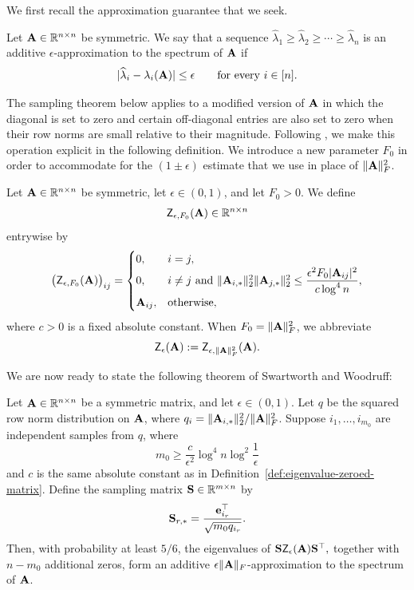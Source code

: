 We first recall the approximation guarantee that we seek.

\begin{definition}
\label{def:additive-eigenvalue-approximation}
Let \(\mathbf{A}\in\mathbb{R}^{n\times n}\) be symmetric. We say that a sequence
\(
    \widehat\lambda_1
    \geq
    \widehat\lambda_2
    \geq
    \cdots
    \geq
    \widehat\lambda_n
\)
is an additive \(\epsilon\)-approximation to the spectrum of \(\mathbf{A}\) if
\[
    |\widehat\lambda_i-\lambda_i(\mathbf{A})|
    \leq
    \epsilon
    \qquad
    \text{for every } i\in[n].
\]
\end{definition}

The sampling theorem below applies to a modified version of \(\mathbf{A}\) in which
the diagonal is set to zero and certain off-diagonal entries are also set to
zero when their row norms are small relative to their magnitude. Following
\cite{swartworth_tight_2024}, we make this operation explicit in the following
definition. We introduce a new parameter \(F_0\) in order to accommodate for
the \((1\pm\epsilon)\) estimate that we use in place of \(\|\mathbf{A}\|^2_F\).

\begin{definition}
\label{def:eigenvalue-zeroed-matrix}
Let \(\mathbf{A}\in\mathbb{R}^{n\times n}\) be symmetric, let
\(\epsilon\in(0,1)\), and let \(F_0>0\). We define
\[
    \mathsf Z_{\epsilon,F_0}(\mathbf{A})\in\mathbb{R}^{n\times n}
\]
entrywise by
\[
    \bigl(\mathsf Z_{\epsilon,F_0}(\mathbf{A})\bigr)_{ij}
    =
    {
    \begin{cases}
    0,
        & i=j,\\
    0,
        & i\neq j
        \text{ and }
        \|\mathbf{A}_{i,*}\|_2^2\|\mathbf{A}_{j,*}\|_2^2
        \leq
        \displaystyle
        \frac{\epsilon^2 F_0|\mathbf{A}_{ij}|^2}
        {c\log^4 n},\\
    \mathbf{A}_{ij},
        & \text{otherwise},
    \end{cases}
    }
\]
where \(c>0\) is a fixed absolute constant. When
\(F_0=\|\mathbf{A}\|_F^2\), we abbreviate
\[
    \mathsf Z_{\epsilon}(\mathbf{A})
    :=
    \mathsf Z_{\epsilon,\|\mathbf{A}\|_F^2}(\mathbf{A}).
\]
\end{definition}
We are now ready to state the following theorem of Swartworth and Woodruff:

\begin{theorem}
\label{thm:sw-row-norm-eigenvalue}
Let \(\mathbf{A}\in\mathbb{R}^{n\times n}\) be a symmetric matrix, and let \(\epsilon\in(0,1)\). Let $q$ be the squared row norm distribution on $\mathbf{A}$, where $q_i = \|\mathbf{A}_{i,*}\|^2_2/\|\mathbf{A}\|^2_F$.
Suppose \(i_1,\ldots,i_{m_0}\) are independent samples from $q$, where
\[
    m_0 \geq
    \frac{c}{\epsilon^2}\log^4 n\log^2\frac{1}{\epsilon}
\]
and $c$ is the same absolute constant as in Definition~\ref{def:eigenvalue-zeroed-matrix}. Define the sampling
matrix \(\mathbf{S}\in\mathbb{R}^{m\times n}\) by
\[
    \mathbf{S}_{r,*}=\frac{\mathbf{e}_{i_r}^{\top}}{\sqrt{m_0 q_{i_r}}}.
\]
Then, with probability at least \(5/6\), the eigenvalues of
\(
    \mathbf{S}\mathsf Z_{\epsilon}(\mathbf{A})\mathbf{S}^\top,
\)
together with \(n-m_0\) additional zeros, form an additive \(\epsilon\|\mathbf{A}\|_F\)-approximation to the spectrum of \(\mathbf{A}\).
\end{theorem}

